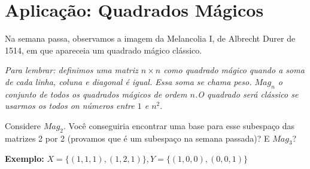 \documentclass[12pt,letterpaper]{article}
\begin{document}
\section*{Aplicação: Quadrados Mágicos}

Na semana passa, observamos a imagem da Melancolia I, de Albrecht Durer de 1514, em que apareceia um quadrado mágico clássico.

\textit{Para lembrar: definimos uma matriz $n\times n$ como quadrado mágico quando a soma de cada linha, coluna e diagonal é igual. Essa soma se chama peso. $Mag_n$ o conjunto de todos os quadrados mágicos de ordem $n$.O quadrado será clássico se usarmos os todos on números entre $1$ e $n^2$}. 

Considere $Mag_2$. Você conseguiria encontrar uma base para esse subespaço das matrizes 2 por 2 (provamos que é um subespaço na semana passada)? E $Mag_3$? 

\textbf{Exemplo: }$X = \{(1,1,1),(1,2,1)\}, Y = \{(1,0,0),(0,0,1)\}$
\end{document}

